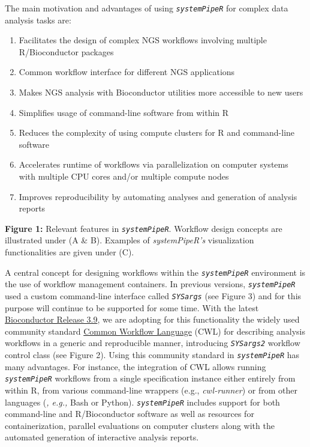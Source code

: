 \documentclass[14pt,]{article}
\providecommand{\tightlist}{%
  \setlength{\itemsep}{0pt}\setlength{\parskip}{0pt}}
\begin{document}
The main motivation and advantages of using \emph{\texttt{systemPipeR}} for complex data analysis tasks are:

\begin{enumerate}
\def\labelenumi{\arabic{enumi}.}
\tightlist
\item
  Facilitates the design of complex NGS workflows involving multiple R/Bioconductor packages
\item
  Common workflow interface for different NGS applications
\item
  Makes NGS analysis with Bioconductor utilities more accessible to new users
\item
  Simplifies usage of command-line software from within R
\item
  Reduces the complexity of using compute clusters for R and command-line software
\item
  Accelerates runtime of workflows via parallelization on computer systems with multiple CPU cores and/or multiple compute nodes
\item
  Improves reproducibility by automating analyses and generation of analysis reports
\end{enumerate}

\textbf{Figure 1:} Relevant features in \emph{\texttt{systemPipeR}}.
Workflow design concepts are illustrated under (A \& B). Examples of
\emph{systemPipeR's} visualization functionalities are given under (C).

A central concept for designing workflows within the \emph{\texttt{systemPipeR}} environment
is the use of workflow management containers. In previous versions, \emph{\texttt{systemPipeR}}
used a custom command-line interface called \emph{\texttt{SYSargs}} (see Figure 3) and for
this purpose will continue to be supported for some time. With the latest \href{http://www.bioconductor.org/packages/release/bioc/html/systemPipeR.html}{Bioconductor Release 3.9},
we are adopting for this functionality the widely used community standard
\href{https://www.commonwl.org/}{Common Workflow Language} (CWL) for describing
analysis workflows in a generic and reproducible manner, introducing \emph{\texttt{SYSargs2}}
workflow control class (see Figure 2). Using this community standard in \emph{\texttt{systemPipeR}}
has many advantages. For instance, the integration of CWL allows running \emph{\texttt{systemPipeR}}
workflows from a single specification instance either entirely from within R, from various command-line
wrappers (e.g., \emph{cwl-runner}) or from other languages (\emph{, e.g.,} Bash or Python).
\emph{\texttt{systemPipeR}} includes support for both command-line and R/Bioconductor software
as well as resources for containerization, parallel evaluations on computer clusters
along with the automated generation of interactive analysis reports.
\end{document}
